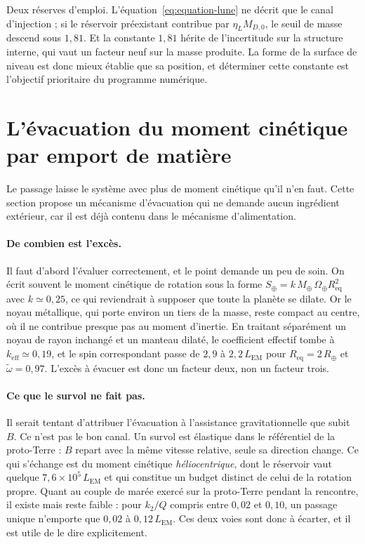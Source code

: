 \documentclass[11pt,a4paper,openany]{report}
\newcommand{\Mt}{M_{\oplus}}
\newcommand{\Rt}{R_{\oplus}}
\newcommand{\Req}{R_{\mathrm{eq}}}
\begin{document}
\begin{controle}
Deux réserves d'emploi. L'équation~\eqref{eq:equation-lune} ne décrit que le canal d'injection ; si
le réservoir préexistant contribue par $\eta_L M_{D,0}$, le seuil de masse descend sous $1{,}81$.
Et la constante $1{,}81$ hérite de l'incertitude sur la structure interne, qui vaut un facteur
neuf sur la masse produite. La forme de la surface de niveau est donc mieux établie que sa
position, et déterminer cette constante est l'objectif prioritaire du programme numérique.
\end{controle}



\section{L'évacuation du moment cinétique par emport de matière}
\label{sec:evacuation}

Le passage laisse le système avec plus de moment cinétique qu'il n'en faut. Cette section propose
un mécanisme d'évacuation qui ne demande aucun ingrédient extérieur, car il est déjà contenu dans
le mécanisme d'alimentation.

\paragraph{De combien est l'excès.} Il faut d'abord l'évaluer correctement, et le point demande
un peu de soin. On écrit souvent le moment cinétique de rotation sous la forme
$S_\oplus=k\,\Mt\,\Omega_\oplus\Req^{2}$ avec $k\simeq0{,}25$, ce qui reviendrait à supposer que
toute la planète se dilate. Or le noyau métallique, qui porte environ un tiers de la masse, reste
compact au centre, où il ne contribue presque pas au moment d'inertie. En traitant séparément un
noyau de rayon inchangé et un manteau dilaté, le coefficient effectif tombe à
$k_{\mathrm{eff}}\simeq0{,}19$, et le spin correspondant passe de $2{,}9$ à $2{,}2\,L_{\mathrm{EM}}$
pour $\Req=2\,\Rt$ et $\tilde\omega=0{,}97$. L'excès à évacuer est donc un facteur deux, non un
facteur trois.

\paragraph{Ce que le survol ne fait pas.} Il serait tentant d'attribuer l'évacuation à
l'assistance gravitationnelle que subit $B$. Ce n'est pas le bon canal. Un survol est élastique
dans le référentiel de la proto-Terre : $B$ repart avec la même vitesse relative, seule sa
direction change. Ce qui s'échange est du moment cinétique \emph{héliocentrique}, dont le réservoir
vaut quelque $7{,}6\times10^{5}\,L_{\mathrm{EM}}$ et qui constitue un budget distinct de celui de
la rotation propre. Quant au couple de marée exercé sur la proto-Terre pendant la rencontre, il
existe mais reste faible : pour $k_2/Q$ compris entre $0{,}02$ et $0{,}10$, un passage unique
n'emporte que $0{,}02$ à $0{,}12\,L_{\mathrm{EM}}$. Ces deux voies sont donc à écarter, et il est
utile de le dire explicitement.
\end{document}
